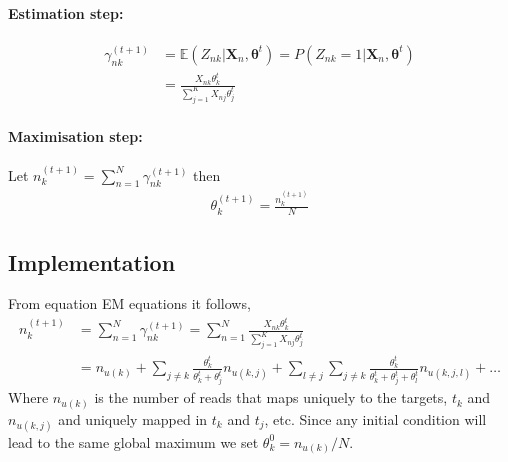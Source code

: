 \documentclass[12pt]{article}
\newcommand{\nn}{\nonumber \\ }
\begin{document}
\paragraph{Estimation step:}
\begin{align}
    \gamma_{nk}^{(t+1)} &= \mathbb E (Z_{nk}|\bm X_n, \bm \theta^t) 
    = P(Z_{nk} = 1 | \bm X_n, \bm \theta^t) \nn 
    &= \frac{X_{nk}\theta_k^t}{\sum_{j=1}^KX_{nj}\theta_j^t}
    \label{eq:E}
\end{align}
\paragraph{Maximisation step:} Let $n_k^{(t+1)} = \sum_{n=1}^N
\gamma_{nk}^{(t+1)}$ then 
\begin{align}
    \theta_k^{(t+1)} = \frac{n_k^{(t+1)}}{N}
    \label{eq:M}
\end{align}

\subsection{Implementation}

From equation EM equations it follows,
\begin{align}
    \label{eq:}
    n_k^{(t+1)} &= \sum_{n=1}^N \gamma_{nk}^{(t+1)} 
    = \sum_{n=1}^N\frac{X_{nk}\theta_k^t}{\sum_{j=1}^KX_{nj}\theta_j^t}\nn
    &= n_{u(k)} 
    + \sum_{j\neq k} \frac{\theta_k^t}{\theta_k^t + \theta_j^t}n_{u(k,j)}
    + \sum_{l\neq j}\sum_{j\neq k} 
    \frac{\theta_k^t}{\theta_k^t + \theta_j^t+ \theta_l^t} n_{u(k,j,l)} +
    \ldots
\end{align}
Where $n_{u(k)}$ is the number of reads that maps uniquely to
the targets, $t_k$ and $n_{u(k,j)}$ and uniquely mapped in $t_k$ and $t_j$,
etc. Since any initial condition will lead to the same global maximum we
set $\theta_k^0 = n_{u(k)}/N$.
%
%
\end{document}
